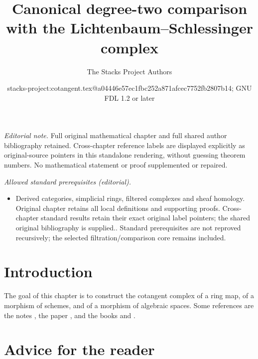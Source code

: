 \documentclass[10pt,a4paper]{article}
\title{Canonical degree-two comparison with the Lichtenbaum–Schlessinger complex}
\author{The Stacks Project Authors}
\date{stacks-project:cotangent.tex@a04446e57ec1fbc252a871afcec7752fb2807b14; GNU FDL 1.2 or later}
\theoremstyle{plain}
\theoremstyle{definition}
\theoremstyle{remark}
\numberwithin{equation}{subsection}
\begin{document}
\maketitle
\noindent\textit{Editorial note.} Full original mathematical chapter and full shared author bibliography retained. Cross-chapter reference labels are displayed explicitly as original-source pointers in this standalone rendering, without guessing theorem numbers. No mathematical statement or proof supplemented or repaired.\par\medskip
\noindent\textit{Allowed standard prerequisites (editorial).}\begin{itemize}
\item Derived categories, simplicial rings, filtered complexes and sheaf homology. Original chapter retains all local definitions and supporting proofs. Cross-chapter standard results retain their exact original label pointers; the shared original bibliography is supplied.. Standard prerequisites are not reproved recursively; the selected filtration/comparison core remains included.
\end{itemize}\medskip
\section{Introduction}
\label{section-introduction}

\noindent
The goal of this chapter is to construct the cotangent complex of a
ring map, of a morphism of schemes, and of a morphism of algebraic spaces.
Some references are the notes \cite{quillenhomology}, the paper
\cite{quillencohomology}, and the books
\cite{Andre} and \cite{cotangent}.




\section{Advice for the reader}
\label{section-advice-reader}
\end{document}
